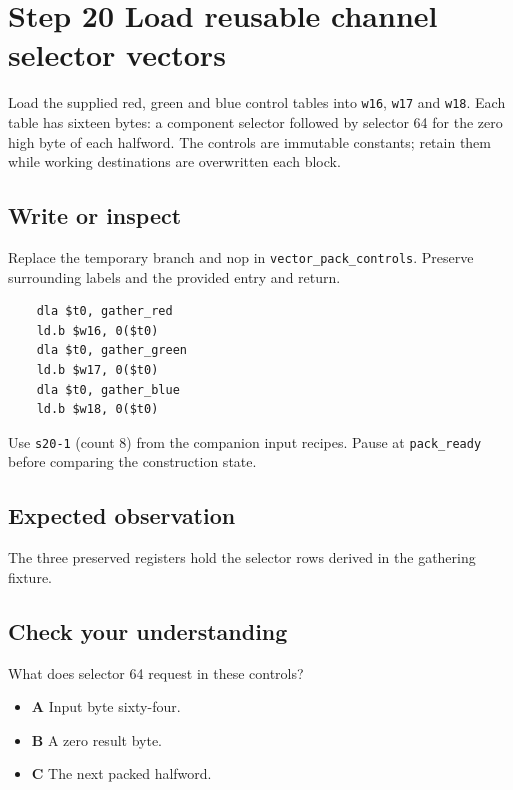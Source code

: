 \section{Step 20 Load reusable channel selector vectors}\label{rgb-s20}

Load the supplied red, green and blue control tables into \texttt{w16}, \texttt{w17} and \texttt{w18}. Each table has sixteen bytes: a component selector followed by selector 64 for the zero high byte of each halfword. The controls are immutable constants; retain them while working destinations are overwritten each block.

\subsection{Write or inspect}
Replace the temporary branch and nop in \texttt{vector\_pack\_controls}. Preserve surrounding labels and the provided entry and return.

\begin{verbatim}
    dla $t0, gather_red
    ld.b $w16, 0($t0)
    dla $t0, gather_green
    ld.b $w17, 0($t0)
    dla $t0, gather_blue
    ld.b $w18, 0($t0)
\end{verbatim}
Use \texttt{s20-1} (count 8) from the companion input recipes. Pause at \texttt{pack\_ready} before comparing the construction state.

\subsection{Expected observation}
The three preserved registers hold the selector rows derived in the gathering fixture.

\subsection{Check your understanding}
What does selector 64 request in these controls?

\begin{itemize}
  \item \textbf{A} Input byte sixty-four.
  \item \textbf{B} A zero result byte.
  \item \textbf{C} The next packed halfword.
\end{itemize}
